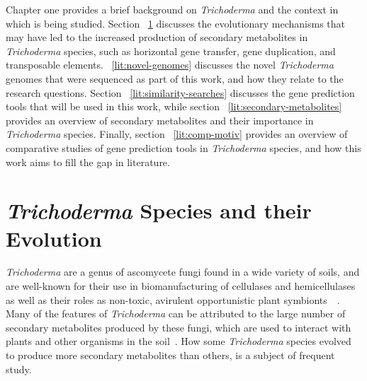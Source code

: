 
Chapter one provides a brief background on \textit{Trichoderma} and the context in which is being studied. Section ~\ref{lit:evolution} discusses the evolutionary mechanisms that may have led to the increased production of secondary metabolites in \textit{Trichoderma} species, such as horizontal gene transfer, gene duplication, and transposable elements. ~\ref{lit:novel-genomes} discusses the novel \textit{Trichoderma} genomes that were sequenced as part of this work, and how they relate to the research questions. Section ~\ref{lit:similarity-searches} discusses the gene prediction tools that will be used in this work, while section ~\ref{lit:secondary-metabolites} provides an overview of secondary metabolites and their importance in \textit{Trichoderma} species. Finally, section ~\ref{lit:comp-motiv} provides an overview of comparative studies of gene prediction tools in \textit{Trichoderma} species, and how this work aims to fill the gap in literature.

\section{\textit{Trichoderma} Species and their Evolution}
\label{lit:evolution}

\textit{Trichoderma} are a genus of ascomycete fungi found in a wide
variety of soils, and are well-known for their use in biomanufacturing
of cellulases and hemicellulases as well as their roles as non-toxic,
avirulent opportunistic plant symbionts~\cite{woo2023a}~\cite{kubicek2019a}. 
Many of the features of \textit{Trichoderma}
can be attributed to the large number of secondary metabolites
produced by these fungi, which are used to interact with plants and other organisms in the soil~\cite{Mukherjee2012}. How some \textit{Trichoderma} species evolved to produce more secondary metabolites than others, is a subject of frequent study.

